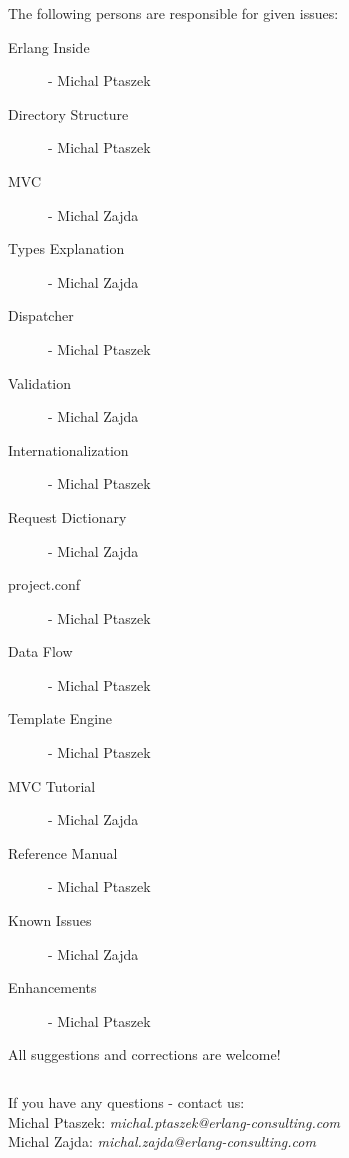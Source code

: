 The following persons are responsible for given issues:
\begin{description}
\item[Erlang Inside]- Michal Ptaszek
\item[Directory Structure]- Michal Ptaszek
\item[MVC]- Michal Zajda
\item[Types Explanation]- Michal Zajda
\item[Dispatcher]- Michal Ptaszek
\item[Validation]- Michal Zajda
\item[Internationalization]- Michal Ptaszek
\item[Request Dictionary]- Michal Zajda
\item[project.conf]- Michal Ptaszek
\item[Data Flow]- Michal Ptaszek
\item[Template Engine]- Michal Ptaszek
\item[MVC Tutorial]- Michal Zajda
\item[Reference Manual]- Michal Ptaszek
\item[Known Issues]- Michal Zajda
\item[Enhancements]- Michal Ptaszek
\end{description}

All suggestions and corrections are welcome!

$ $

If you have any questions - contact us:\\
Michal Ptaszek: {\it michal.ptaszek@erlang-consulting.com}\\
Michal Zajda: {\it michal.zajda@erlang-consulting.com}
